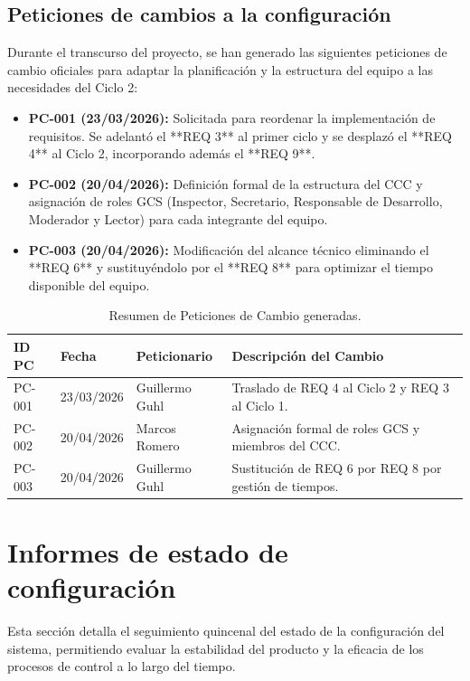 \documentclass[11pt,a4paper]{article}
\begin{document}
\subsection{Peticiones de cambios a la configuración}

Durante el transcurso del proyecto, se han generado las siguientes peticiones de cambio oficiales para adaptar la planificación y la estructura del equipo a las necesidades del Ciclo 2:

\begin{itemize}
    \item \textbf{PC-001 (23/03/2026):} Solicitada para reordenar la implementación de requisitos. Se adelantó el **REQ 3** al primer ciclo y se desplazó el **REQ 4** al Ciclo 2, incorporando además el **REQ 9**.
    \item \textbf{PC-002 (20/04/2026):} Definición formal de la estructura del CCC y asignación de roles GCS (Inspector, Secretario, Responsable de Desarrollo, Moderador y Lector) para cada integrante del equipo.
    \item \textbf{PC-003 (20/04/2026):} Modificación del alcance técnico eliminando el **REQ 6** y sustituyéndolo por el **REQ 8** para optimizar el tiempo disponible del equipo.
\end{itemize}

\begin{table}[H]
\centering
\small
\begin{tabularx}{\textwidth}{@{}l l l L@{}}
\toprule
\textbf{ID PC} & \textbf{Fecha} & \textbf{Peticionario} & \textbf{Descripción del Cambio} \\ \midrule
PC-001 & 23/03/2026 & Guillermo Guhl & Traslado de REQ 4 al Ciclo 2 y REQ 3 al Ciclo 1. \\
PC-002 & 20/04/2026 & Marcos Romero & Asignación formal de roles GCS y miembros del CCC. \\
PC-003 & 20/04/2026 & Guillermo Guhl & Sustitución de REQ 6 por REQ 8 por gestión de tiempos. \\
\bottomrule
\end{tabularx}
\caption{Resumen de Peticiones de Cambio generadas.}
\end{table}


\section{Informes de estado de configuración}

Esta sección detalla el seguimiento quincenal del estado de la configuración del sistema, permitiendo evaluar la estabilidad del producto y la eficacia de los procesos de control a lo largo del tiempo.
\end{document}
